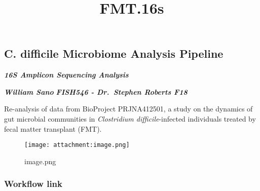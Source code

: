 \documentclass[11pt]{article}
\title{FMT.16s}
\makeatletter
\def\maxwidth{\ifdim\Gin@nat@width>\linewidth\linewidth
    \else\Gin@nat@width\fi}
\let\Oldincludegraphics\includegraphics
\renewcommand{\includegraphics}[1]{\Oldincludegraphics[width=.8\maxwidth]{#1}}
\makeatother
\begin{document}
    
    
    \maketitle
    
    

    
    \hypertarget{c.-difficile-microbiome-analysis-pipeline}{%
\subsection{C. difficile Microbiome Analysis
Pipeline}\label{c.-difficile-microbiome-analysis-pipeline}}

\textbf{\emph{16S Amplicon Sequencing Analysis}}

\textbf{\emph{William Sano}} \textbf{\emph{FISH546 - Dr.~Stephen Roberts
F18}}

    Re-analysis of data from BioProject PRJNA412501, a study on the dynamics
of gut microbial communities in \emph{Clostridium difficile}-infected
individuals treated by fecal matter transplant (FMT).

    \begin{figure}
\centering
\texttt{[image: attachment:image.png]}
\caption{image.png}
\end{figure}

    \hypertarget{workflow-link}{%
\subsubsection{Workflow link}\label{workflow-link}}
\end{document}

